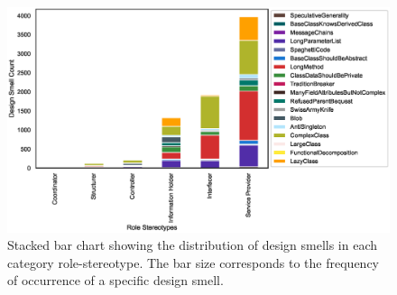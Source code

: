 \documentclass[AMA,Times1COL]{WileyNJDv5} %
\begin{document}
	\begin{figure}[!h]
		\centerline{\includegraphics[width=\textwidth]{figures/stackedbar_plot}}
		\caption{Stacked bar chart showing the distribution of design smells in each category role-stereotype. The bar size corresponds to the frequency of occurrence of a specific design smell.\label{fig:bubble_chart}}
	\end{figure}
	
\end{document}
